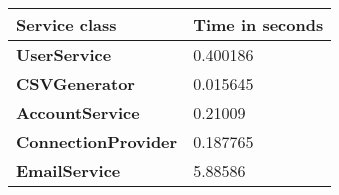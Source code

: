 \begin{longtable}{|m{9cm}|l|}
\hline
\cellcolor[HTML]{C0C0C0}\textbf{Service class} & \multicolumn{1}{p{8cm}|}{\cellcolor[HTML]{C0C0C0}\textbf{Time in seconds}}\\ \hline
\cellcolor[HTML]{C0C0C0}\textbf{UserService} & \multicolumn{1}{p{8cm}|}{0.400186}\\ \hline
\cellcolor[HTML]{C0C0C0}\textbf{CSVGenerator} & \multicolumn{1}{p{8cm}|}{0.015645}\\ \hline
\cellcolor[HTML]{C0C0C0}\textbf{AccountService} & \multicolumn{1}{p{8cm}|}{0.21009}\\ \hline
\cellcolor[HTML]{C0C0C0}\textbf{ConnectionProvider} & \multicolumn{1}{p{8cm}|}{0.187765}\\ \hline
\cellcolor[HTML]{C0C0C0}\textbf{EmailService} & \multicolumn{1}{p{8cm}|}{5.88586}\\ \hline
\end{longtable}


